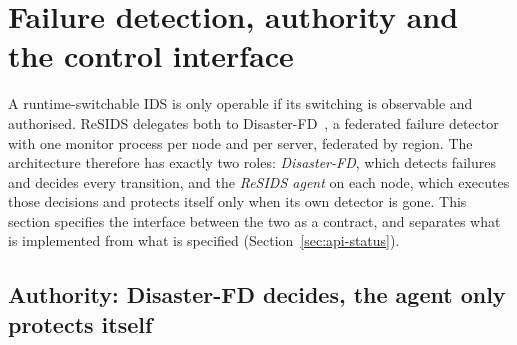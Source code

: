 
%
%

\section{Failure detection, authority and the control interface}
\label{sec:api}

A runtime-switchable IDS is only operable if its switching is observable and authorised.
ReSIDS delegates both to Disaster-FD~\cite{disasterfd2025}, a federated failure detector
with one monitor process per node and per server, federated by region. The architecture
therefore has exactly two roles: \emph{Disaster-FD}, which detects failures and decides
every transition, and the \emph{ReSIDS agent} on each node, which executes those decisions
and protects itself only when its own detector is gone. This section specifies the
interface between the two as a contract, and separates what is implemented from what is
specified (Section~\ref{sec:api-status}).

\subsection{Authority: Disaster-FD decides, the agent only protects itself}
\label{sec:api-authority}

